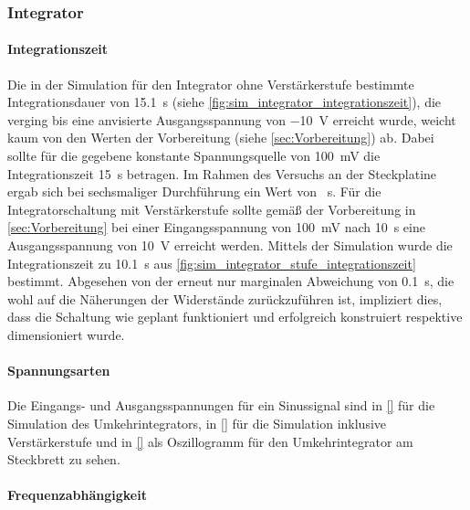 \documentclass[12pt,english,ngerman]{scrartcl}
\begin{document}
\subsubsection{Integrator}
\paragraph{Integrationszeit}
Die in der Simulation für den Integrator ohne Verstärkerstufe bestimmte
Integrationsdauer von \SI{15,1}{\second} (siehe
\autoref{fig:sim_integrator_integrationszeit}), die verging bis eine anvisierte
Ausgangsspannung von \SI{-10}{\volt} erreicht wurde, weicht kaum von den Werten
der Vorbereitung (siehe \autoref{sec:Vorbereitung}) ab. Dabei sollte für die
gegebene konstante Spannungsquelle von \SI{100}{\milli\volt} die
Integrationszeit \SI{15}{\second} betragen. Im Rahmen des Versuchs an der
Steckplatine ergab sich bei sechsmaliger Durchführung ein Wert von
\SI{}{\second}.
\newline
Für die Integratorschaltung mit Verstärkerstufe sollte gemäß der Vorbereitung
in \autoref{sec:Vorbereitung} bei einer Eingangsspannung von
\SI{100}{\milli\volt} nach \SI{10}{\second} eine Ausgangsspannung von
\SI{10}{\volt} erreicht werden. Mittels der Simulation wurde die
Integrationszeit zu \SI{10,1}{\second} aus
\autoref{fig:sim_integrator_stufe_integrationszeit} bestimmt. Abgesehen von der
erneut nur marginalen Abweichung von \SI{0,1}{\second}, die wohl auf die
Näherungen der Widerstände zurückzuführen ist, impliziert dies, dass die
Schaltung wie geplant funktioniert und erfolgreich konstruiert respektive
dimensioniert wurde.

\paragraph{Spannungsarten}
Die Eingangs- und Ausgangsspannungen für ein Sinussignal sind in \autoref{} für
die Simulation des Umkehrintegrators, in \autoref{} für die Simulation
inklusive Verstärkerstufe und in \autoref{} als Oszillogramm für den
Umkehrintegrator am Steckbrett zu sehen.

\paragraph{Frequenzabhängigkeit}
\end{document}
